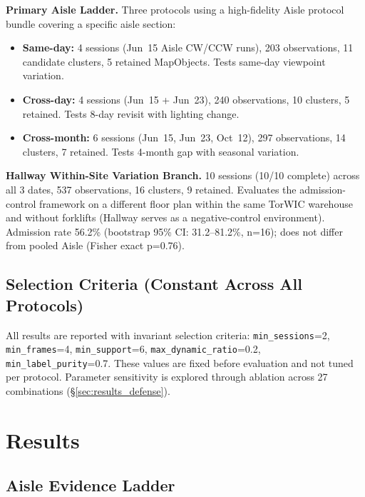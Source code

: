 \documentclass[journal]{IEEEtran}
\begin{document}
\textbf{Primary Aisle Ladder.} Three protocols using a high-fidelity Aisle protocol bundle covering a specific aisle section:
\begin{itemize}
  \item \textbf{Same-day:} 4 sessions (Jun~15 Aisle CW/CCW runs), 203 observations, 11 candidate clusters, 5 retained MapObjects. Tests same-day viewpoint variation.
  \item \textbf{Cross-day:} 4 sessions (Jun~15 + Jun~23), 240 observations, 10 clusters, 5 retained. Tests 8-day revisit with lighting change.
  \item \textbf{Cross-month:} 6 sessions (Jun~15, Jun~23, Oct~12), 297 observations, 14 clusters, 7 retained. Tests 4-month gap with seasonal variation.
\end{itemize}

\textbf{Hallway Within-Site Variation Branch.} 10 sessions (10/10 complete) across all 3 dates, 537 observations, 16 clusters, 9 retained. Evaluates the admission-control framework on a different floor plan within the same TorWIC warehouse and without forklifts (Hallway serves as a negative-control environment). Admission rate 56.2\% (bootstrap 95\% CI: 31.2--81.2\%, n=16); does not differ from pooled Aisle (Fisher exact p=0.76).

\subsection{Selection Criteria (Constant Across All Protocols)}
\label{sec:protocol_criteria}

All results are reported with invariant selection criteria: \texttt{min\_sessions}=2, \texttt{min\_frames}=4, \texttt{min\_support}=6, \texttt{max\_dynamic\_ratio}=0.2, \texttt{min\_label\_purity}=0.7. These values are fixed before evaluation and not tuned per protocol. Parameter sensitivity is explored through ablation across 27 combinations (\S\ref{sec:results_defense}).

\section{Results}
\label{sec:results}

\subsection{Aisle Evidence Ladder}
\label{sec:results_aisle}
\end{document}
